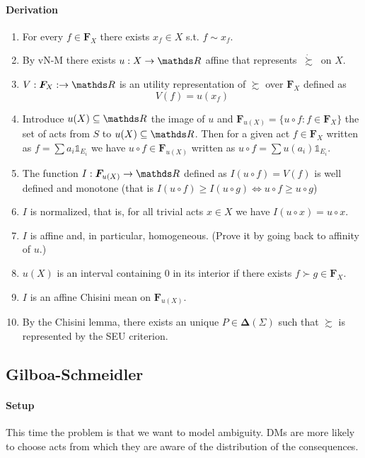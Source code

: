 \documentclass[landscape, 12pt]{extarticle}
\newcommand{\dsuccsim}{\ \dot \succsim \ }
\begin{document}
\begin{multicols}{2}
	\paragraph{Derivation}
	\begin{enumerate}
		\item For every $f \in \bm F_X$ there exists $x_f \in X$ s.t. $f \sim x_f$.
		\item By vN-M there exists $u:X \to \R$ affine that represents $\dsuccsim$ on $X$.
		\item $V: \bm F_X: \to \R$ is an utility representation of $\succsim$ over $\bm F_X$
		      defined as
		      \[V(f) = u(x_f)\]
		\item Introduce $u(X) \subseteq \R$ the image of $u$ and
		      $\bm F_{u(X)} = \{ u \circ f:f \in \bm F_X \}$
		      the set of acts from $S$ to $u(X) \subseteq \R$.
		      Then for a given act $f \in \bm F_X$ written as $f = \sum a_i \mathds 1_{E_i}$
		      we have $u \circ f \in \bm F_{u(X)}$
		      written as $u \circ f = \sum u(a_i) \mathds 1_{E_i}$.
		\item The function $I: \bm F_{u(X)} \to \R$ defined as $I(u\circ f) = V(f)$
		      is well defined and monotone
		      (that is $I(u\circ f) \geq I(u \circ g) \iff u\circ f \geq u\circ g$)
		\item $I$ is normalized, that is,
		      for all trivial acts $x \in X$ we have $I(u \circ x) = u \circ x$.
		\item $I$ is affine and, in particular, homogeneous. (Prove it by going back to affinity of $u$.)
		\item $u(X)$ is an interval containing $0$
		      in its interior if there exists $f \succ g \in \bm F_X$.
		\item $I$ is an affine Chisini mean on $\bm F_{u(X)}$.
		\item By the Chisini lemma, there exists an unique $P \in \bm \Delta(\Sigma)$
		      such that $\succsim$ is represented by the SEU criterion.
	\end{enumerate}

	\subsection{Gilboa-Schmeidler}

	\paragraph{Setup}
	This time the problem is that we want to model ambiguity.
	DMs are more likely to choose acts from which they are aware
	of the distribution of the consequences.


\end{multicols}
\end{document}
